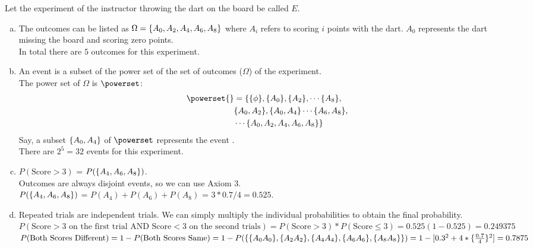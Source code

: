 Let the experiment of the instructor throwing the dart on the board be called $E$.
\begin{enumerate}[a.]
	\item The outcomes can be listed as $\Omega = \{A_0, A_2, A_4, A_6, A_8\}$ where $A_i$ refers to scoring $i$ points with the dart. $A_0$ represents the dart missing the board and scoring zero points. \\
	In total there are $5$ outcomes for this experiment.
	\item An event is a subset of the power set of the set of outcomes ($\Omega$) of the experiment.\\
	The power set of $\Omega$ is $\powerset$: 
	\begin{align}
		\powerset{} &= \{\set\phi, \set{A_0}, \set{ A_2}, \cdots  \set{A_8}, \nonumber\\
		& \set{A_0, A_2}, \set{A_0, A_4} \cdots \set{A_6, A_8}, \nonumber \\ 
		& \cdots \set{A_0, A_2, A_4, A_6, A_8}\} \nonumber 
	\end{align}
	Say, a subset $\{A_0, A_4\}$ of $\powerset$ represents the event .\\
	There are $2^5 = 32$ events for this experiment.
	\item $P(\text{Score} > 3)$ = $P(\{A_4, A_6, A_8\})$.\\ Outcomes are always disjoint events, so we can use Axiom 3. \\
	$P(\{A_4, A_6, A_8\})$ = $P(A_4) + P(A_6) + P(A_8)$ = $3*0.7/4 = 0.525$.
	\item Repeated trials are independent trials. We can simply multiply the individual probabilities to obtain the final probability. \\
	$P(\text{Score} > 3 \text{ on the first trial AND Score} < 3 \text{ on the second trials}) = P(\text{Score} > 3)*P(\text{Score} \leq 3) = 0.525(1-0.525) = 0.249375$\\[10pt]
	$P(\text{Both Scores Different}) = 1 - P(\text{Both Scores Same}) \\
	= 1 - P(\{\{A_0 A_0\}, \{A_2 A_2\}, \{A_4 A_4\}, \{A_6 A_6\}, \{A_8 A_8\}\}) \\
	= 1 - [0.3^2 + 4*\{\frac{0.7}{4}\}^2] = 0.7875$
\end{enumerate}
